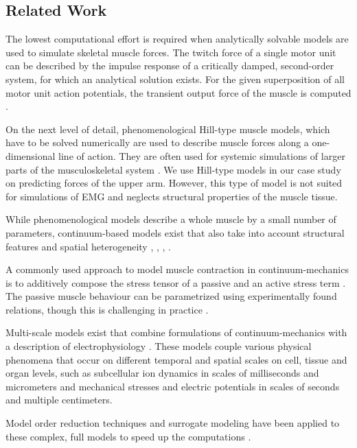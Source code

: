 \subsection{Related Work}
The lowest computational effort is required when analytically solvable models are used to simulate skeletal muscle forces. The twitch force of a single motor unit can be described by the impulse response of a critically damped, second-order system, for which an analytical solution exists. For the given superposition of all motor unit action potentials, the transient output force of the muscle is computed  \cite{Cisi2008,Dideriksen2010}.

On the next level of detail, phenomenological Hill-type muscle models, which have to be solved numerically are used to describe muscle forces along a one-dimensional line of action. They are often used for systemic simulations of larger parts of the musculoskeletal system \cite{Zajac1989,OpenSim2007,Hilltype2014,Bayer2017}. We use Hill-type models in our case study on predicting forces of the upper arm. However, this type of model is not suited for simulations of EMG and neglects structural properties of the muscle tissue.

While phenomenological models describe a whole muscle by a small number of parameters, continuum-based models exist that also take into account structural features and spatial heterogeneity \cite{Johansson2000}, \cite{Blemker2005a}, \cite{Roehrle2007}, \cite{Boel2008}.

A commonly used approach to model muscle contraction in continuum-mechanics is to additively compose the stress tensor of a passive and an active stress term \cite{blemker2005three,Johansson2000,Roehrle2008}. The passive muscle behaviour can be parametrized using experimentally found relations, though this is challenging in practice \cite{Boel2012,Takaza2013,VanLoocke2008,VanLoocke2006}.

Multi-scale models exist that combine formulations of continuum-mechanics with a description of electrophysiology \cite{Roehrle2008,Roehrle2012,Heidlauf2013,HernandezGascon2013}.
These models couple various physical phenomena that occur on different temporal and spatial scales on cell, tissue and organ levels, such as subcellular ion dynamics in scales of milliseconds and micrometers and mechanical stresses and electric potentials in scales of seconds and multiple centimeters.%

Model order reduction techniques and surrogate modeling have been applied to these complex, full models to speed up the computations \cite{Mordhorst2017,Valentin2018}.

